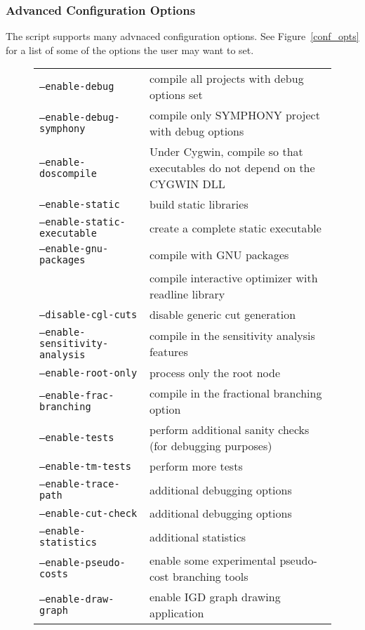 \subsubsection{Advanced Configuration Options}

The  script supports many advnaced configuration
options. See Figure~\ref{conf_opts} for a list of some of the options the user
may want to set.  
 
\begin{figure}[htb]
\begin{tabular}{ll}
\hline
\texttt{--enable-debug} & compile all projects with debug options set \\
\texttt{--enable-debug-symphony} & compile only SYMPHONY project with debug options \\
\texttt{--enable-doscompile} & Under Cygwin, compile so that executables do
not depend on the CYGWIN DLL \\
\texttt{--enable-static} & build static libraries \\
\texttt{--enable-static-executable} &  create a complete static executable \\
\texttt{--enable-gnu-packages} & compile with GNU packages \\ 
& compile interactive optimizer with readline library \\
\hline
\texttt{--disable-cgl-cuts} & disable generic cut generation \\
\texttt{--enable-sensitivity-analysis} & compile in the sensitivity analysis features \\
\texttt{--enable-root-only} & process only the root node \\
\texttt{--enable-frac-branching} & compile in the fractional branching option \\
\texttt{--enable-tests}&  perform additional sanity checks (for debugging purposes) \\
\texttt{--enable-tm-tests }& perform more tests  \\
\texttt{--enable-trace-path}&  additional debugging options \\
\texttt{--enable-cut-check}& additional debugging options \\
\texttt{--enable-statistics}& additional statistics \\
\texttt{--enable-pseudo-costs}& enable some experimental pseudo-cost branching tools \\
\texttt{--enable-draw-graph} &  enable IGD graph drawing application \\

\end{tabular}
\end{figure}

